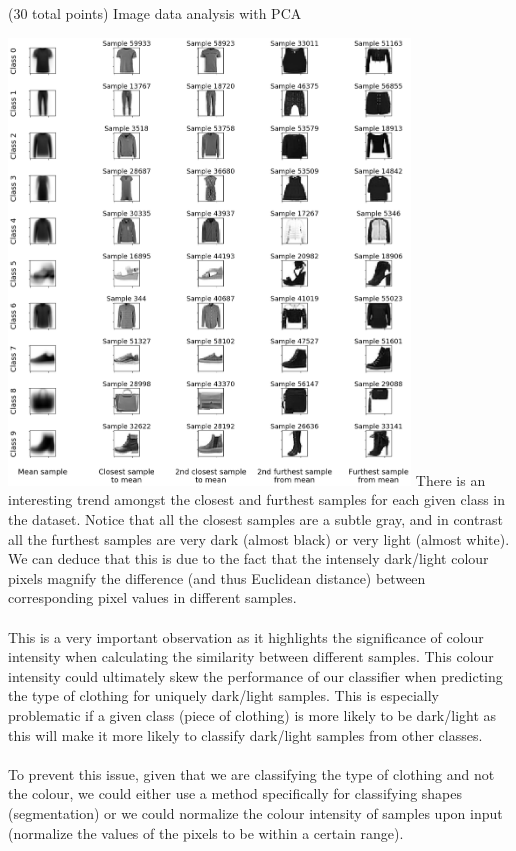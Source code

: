 \documentclass[12pt]{article}
\begin{document}
\begin{question}{(30 total points) Image data analysis with PCA}
\begin{subquestion}
  \begin{answerbox}{52em}
    \includegraphics[width=0.8\textwidth]{images/q12.png}
    \footnotesize{
    There is an interesting trend amongst the closest and furthest samples for each given class in the dataset. Notice that all the closest samples are a subtle gray, and in contrast all the furthest samples are very dark (almost black) or very light (almost white). We can deduce that this is due to the fact that the intensely dark/light colour pixels magnify the difference (and thus Euclidean distance) between corresponding pixel values in different samples.\\
\\
    This is a very important observation as it highlights the significance of colour intensity when calculating the similarity between different samples. This colour intensity could ultimately skew the performance of our classifier when predicting the type of clothing for uniquely dark/light samples. This is especially problematic if a given class (piece of clothing) is more likely to be dark/light as this will make it more likely to classify dark/light samples from other classes.\\
\\
    To prevent this issue, given that we are classifying the type of clothing and not the colour, we could either use a method specifically for classifying shapes (segmentation) or we could normalize the colour intensity of samples upon input (normalize the values of the pixels to be within a certain range).}
  \end{answerbox}




\end{subquestion}
\end{question}
\end{document}
